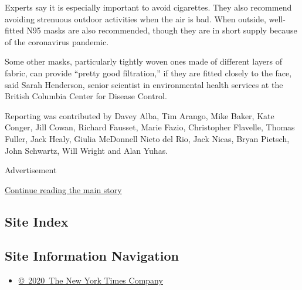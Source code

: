 Experts say it is especially important to avoid cigarettes. They also
recommend avoiding strenuous outdoor activities when the air is bad.
When outside, well-fitted N95 masks are also recommended, though they
are in short supply because of the coronavirus pandemic.

Some other masks, particularly tightly woven ones made of different
layers of fabric, can provide ``pretty good filtration,'' if they are
fitted closely to the face, said Sarah Henderson, senior scientist in
environmental health services at the British Columbia Center for Disease
Control.

Reporting was contributed by Davey Alba, Tim Arango, Mike Baker, Kate
Conger, Jill Cowan, Richard Fausset, Marie Fazio, Christopher Flavelle,
Thomas Fuller, Jack Healy, Giulia McDonnell Nieto del Rio, Jack Nicas,
Bryan Pietsch, John Schwartz, Will Wright and Alan Yuhas.

Advertisement

\protect\hyperlink{after-bottom}{Continue reading the main story}

\hypertarget{site-index}{%
\subsection{Site Index}\label{site-index}}

\hypertarget{site-information-navigation}{%
\subsection{Site Information
Navigation}\label{site-information-navigation}}

\begin{itemize}
\tightlist
\item
  \href{https://help.nytimes3xbfgragh.onion/hc/en-us/articles/115014792127-Copyright-notice}{©~2020~The
  New York Times Company}
\end{itemize}

